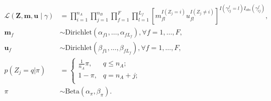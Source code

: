 \documentclass[ba]{imsart}
\begin{document}
%
\begin{subequations}
\begin{align}
	\mathcal{L}(\bm{Z}, \bm{m}, \bm{u} \mid \gamma) &= \prod_{i=1}^{n_A}  \prod_{j=1}^{n_B}\prod_{f=1}^{F}\prod_{l=1}^{L_f}\left[  m_{fl}^{I(Z_j = i)}u_{fl}^{I(Z_j \neq i)}\right]^{I(\gamma_{ij}^f = l)I_{obs}(\gamma_{ij}^f)}, \label{eqn:likelihood}\\
	\bm{m}_f &\sim \text{Dirichlet}(\alpha_{f1}, \ldots, \alpha_{f L_f}), \forall f = 1, \ldots, F, \label{eqn:m} \\
	\bm{u}_f &\sim \text{Dirichlet}(\beta_{f1}, \ldots, \beta_{f L_f}),\forall f = 1, \ldots, F,  \label{eqn:u}\\
	p(Z_j = q| \pi)  &=
	\begin{cases} 
		\frac{1}{n_A}\pi,  & q \leq n_A; \\
		1-\pi, &  q  = n_A + j; \\
	\end{cases} \label{eqn:z}\\
	\pi &\sim \text{Beta}(\alpha_{\pi}, \beta_{\pi})\label{eqn:pi}.
\end{align}
\end{subequations}
\end{document}

